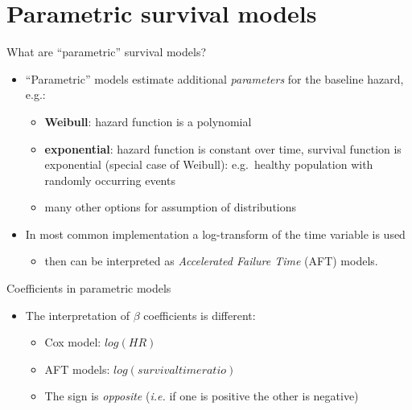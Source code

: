 \documentclass[
  ignorenonframetext,
]{beamer}
\providecommand{\tightlist}{%
  \setlength{\itemsep}{0pt}\setlength{\parskip}{0pt}}
\begin{document}
\hypertarget{parametric-survival-models}{%
\section{Parametric survival models}\label{parametric-survival-models}}

\begin{frame}{What are ``parametric'' survival models?}
\protect\hypertarget{what-are-parametric-survival-models}{}

\begin{itemize}
\tightlist
\item
  ``Parametric'' models estimate additional \emph{parameters} for the
  baseline hazard, e.g.:

  \begin{itemize}
  \tightlist
  \item
    \textbf{Weibull}: hazard function is a polynomial
  \item
    \textbf{exponential}: hazard function is constant over time,
    survival function is exponential (special case of Weibull):
    e.g.~healthy population with randomly occurring events
  \item
    many other options for assumption of distributions
  \end{itemize}
\item
  In most common implementation a log-transform of the time variable is
  used

  \begin{itemize}
  \tightlist
  \item
    then can be interpreted as \emph{Accelerated Failure Time} (AFT)
    models.
  \end{itemize}
\end{itemize}

\end{frame}

\begin{frame}{Coefficients in parametric models}
\protect\hypertarget{coefficients-in-parametric-models}{}

\begin{itemize}
\tightlist
\item
  The interpretation of \(\beta\) coefficients is different:

  \begin{itemize}
  \tightlist
  \item
    Cox model: \(log(HR)\)
  \item
    AFT models: \(log(survival time ratio)\)
  \item
    The sign is \emph{opposite} (\emph{i.e.} if one is positive the
    other is negative)
  \end{itemize}
\end{itemize}

\end{frame}
\end{document}
